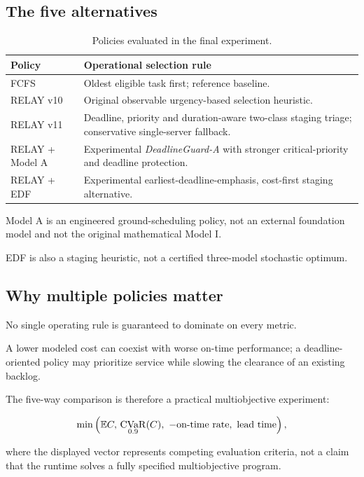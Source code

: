 \documentclass[10pt,a4paper]{article}
\DeclareMathOperator{\CVaR}{CVaR}
\newcommand{\EE}{\mathbb{E}}
\theoremstyle{plain}
\theoremstyle{definition}
\theoremstyle{remark}
\begin{document}
\subsection{The five alternatives}

\begin{table}[!htbp]
\centering
\caption{Policies evaluated in the final experiment.}
\label{tab:policies}
\small
\begin{tabularx}{\linewidth}{@{}p{30mm}L@{}}
\toprule
Policy & Operational selection rule \\
\midrule
FCFS &
Oldest eligible task first;
reference baseline. \\
RELAY v10 &
Original observable urgency-based
selection heuristic. \\
RELAY v11 &
Deadline, priority and duration-aware
two-class staging triage;
conservative single-server fallback. \\
RELAY + Model A &
Experimental \emph{DeadlineGuard-A}
with stronger critical-priority
and deadline protection. \\
RELAY + EDF &
Experimental earliest-deadline-emphasis,
cost-first staging alternative. \\
\bottomrule
\end{tabularx}
\end{table}

Model A is an engineered
ground-scheduling policy,
not an external foundation model
and not the original mathematical Model I.

EDF is also a staging heuristic,
not a certified
three-model stochastic optimum.

\subsection{Why multiple policies matter}

No single operating rule is
guaranteed to dominate on every metric.

A lower modeled cost can coexist with
worse on-time performance;
a deadline-oriented policy may prioritize
service while slowing the clearance
of an existing backlog.

The five-way comparison is therefore
a practical multiobjective experiment:

\[
\min
\left(
\EE C,\space{}
\CVaR_{0.9}(C),\
-\text{on-time rate},\
\text{lead time}
\right),
\]

where the displayed vector
represents competing evaluation criteria,
not a claim that the runtime solves
a fully specified multiobjective program.
\end{document}
